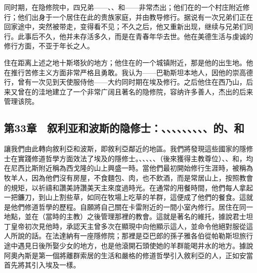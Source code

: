 同时期，在隐修院中，四兄弟——、、和——非常杰出；他们在的一个村庄附近修行；他们出身于一个居住在此的贵族家庭，并由教导修行。据说有一次兄弟们正在回家途中，突然被带走，变得看不见；不久之后，他又重新出现，继续与兄弟们同行。此事后不久，他并未存活多久，而是在青春年华去世。他在美德生活与虔诚的修行方面，不亚于年长之人。\par

住在距离上述之地十斯塔狄的地方；他住在的一个城镇附近，那是他的出生地。他在推行苦修主义方面非常严格且勇敢。我认为——巴勒斯坦本地人，因他的崇高德行，曾有一次见到天使服侍他——大约同时期在埃及修行。之后他住在西乃山，后来又曾在的洼地建立了一个非常广阔且著名的隐修院，容纳许多善人，杰出的后来管理该院。\par


\subsection{第33章　叙利亚和波斯的隐修士：、、、、、、、、、的、和}

讓我們由此轉向敘利亞和波斯，即敘利亞鄰近的地區。我們將發現這些國家的隱修士在實踐修道哲學方面效法了埃及的隱修士。、、、、、（後來獲得主教尊位）、、和，均在尼西比斯附近稱為西戈隆的山上興盛一時。當他們最初開始修行生涯時，被稱為牧羊人，因為他們沒有房屋，不食麵包、肉，也不飲酒，而是常居山上，按照教會的規矩，以祈禱和讚美詩讚美天主來度過時光。在通常的用餐時間，他們每人拿起一把鐮刀，到山上割些草，如同在牧場上吃草的羊群，這便成了他們的餐食。這就是他們修道哲學的歷程。自願將自己關在卡雷附近的一間小室內修行。居住在同一地點，並在（當時的主教）之後管理那裡的教會。這就是著名的維托，據說君士坦丁皇帝初次見他時，承認天主曾多次在顯現中向他顯示這人，並命令他絕對服從這人所說的話。在法達納有一座隱修院；那裡是亞巴郎的孫子雅各伯從帕勒斯坦旅行途中遇見日後所娶少女的地方，也是他滾開石頭使她的羊群能喝井水的地方。據說阿奧內斯是第一個將離群索居的生活和嚴格的修道哲學引入敘利亞的人，正如安當首先將其引入埃及一樣。\par

